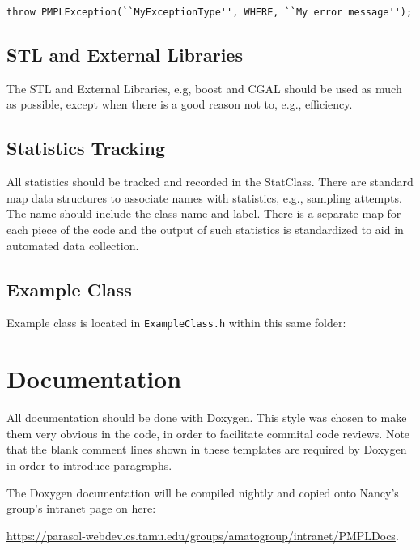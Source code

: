 \documentclass[12pt]{article}
\begin{document}
\begin{lstlisting}
throw PMPLException(``MyExceptionType'', WHERE, ``My error message'');
\end{lstlisting}

\subsection{STL and External Libraries}

The STL and External Libraries, e.g, boost and CGAL should be used as much as
possible, except when there is a good reason not to, e.g., efficiency.

\subsection{Statistics Tracking}

All statistics should be tracked and recorded in the StatClass. There are
standard map data structures to associate names with statistics, e.g., sampling
attempts. The name should include the class name and label. There is a separate
map for each piece of the code and the output of such statistics is standardized
to aid in automated data collection.

\subsection{Example Class}
Example class is located in \texttt{ExampleClass.h} within this same folder:




\section{Documentation}
All documentation should be done with Doxygen. This style was chosen to make
them very obvious in the code, in order to facilitate commital code reviews.
Note that the blank comment lines shown in these templates are required by
Doxygen in order to introduce paragraphs.

The Doxygen documentation will be compiled nightly and copied onto
Nancy's group's intranet page on here:

\url{https://parasol-webdev.cs.tamu.edu/groups/amatogroup/intranet/PMPLDocs}.
\end{document}
